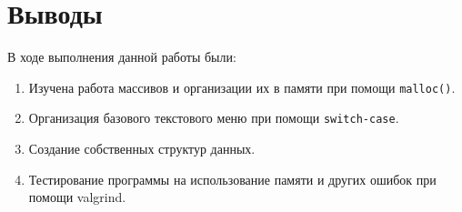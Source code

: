 \section{Выводы}

В ходе выполнения данной работы были:

\begin{enumerate}
  \item Изучена работа массивов и организации их в памяти при помощи \texttt{malloc()}.
  \item Организация базового текстового меню при помощи \texttt{switch-case}.
  \item Создание собственных структур данных.
  \item Тестирование программы на использование памяти и других ошибок при помощи valgrind.
\end{enumerate}
